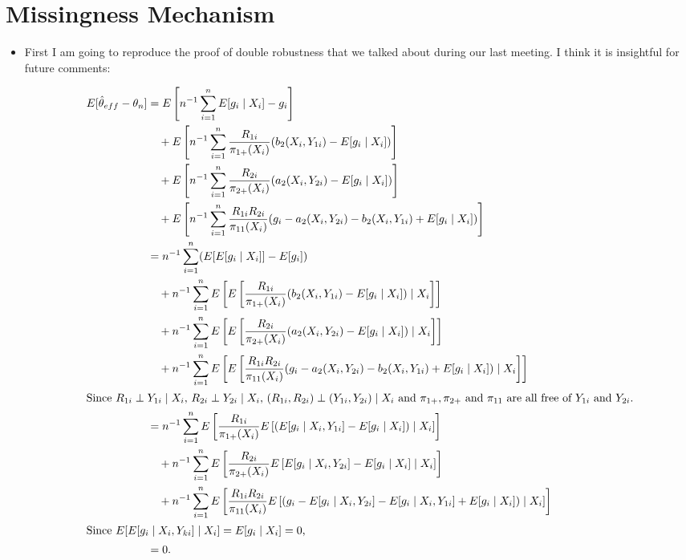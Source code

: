 \documentclass[12pt]{article}
\begin{document}
\newpage

\section*{Missingness Mechanism}

\begin{itemize}
  \item First I am going to reproduce the proof of double robustness that we
    talked about during our last meeting. I think it is insightful for future
    comments:

    \begin{align*}
      E[\hat \theta_{eff} - \theta_n] 
      &= E\left[n^{-1} \sum_{i = 1}^n E[g_i \mid X_i] - g_i\right]\\
      &\quad+ E\left[n^{-1} \sum_{i = 1}^n \frac{R_{1i}}{\pi_{1+}(X_i)}
      (b_2(X_i, Y_{1i}) - E[g_i \mid X_i])\right]\\
      &\quad+ E\left[n^{-1} \sum_{i = 1}^n \frac{R_{2i}}{\pi_{2+}(X_i)}
      (a_2(X_i, Y_{2i}) - E[g_i \mid X_i])\right]\\
      &\quad+ E\left[n^{-1} \sum_{i = 1}^n \frac{R_{1i} R_{2i}}{\pi_{11}(X_i)} 
      (g_i - a_2(X_i, Y_{2i}) - b_2(X_i, Y_{1i}) + E[g_i \mid X_i])\right]\\
      &= n^{-1} \sum_{i = 1}^n (E[E[g_i \mid X_i]] - E[g_i])\\
      &\quad+ n^{-1} \sum_{i = 1}^n E\left[E\left[\frac{R_{1i}}{\pi_{1+}(X_i)} 
      (b_2(X_i, Y_{1i}) - E[g_i \mid X_i]) \mid X_i\right]\right] \\ 
      &\quad+ n^{-1} \sum_{i = 1}^n E\left[E\left[\frac{R_{2i}}{\pi_{2+}(X_i)} 
      (a_2(X_i, Y_{2i}) - E[g_i \mid X_i]) \mid X_i\right]\right] \\
      &\quad+ n^{-1} \sum_{i = 1}^n E\left[E\left[\frac{R_{1i}
      R_{2i}}{\pi_{11}(X_i)} (g_i - a_2(X_i, Y_{2i}) - b_2(X_i, Y_{1i}) + E[g_i
      \mid X_i]) \mid X_i \right]\right]\\
      \intertext{Since $R_{1i} \perp Y_{1i} \mid X_i$, $R_{2i} \perp Y_{2i} \mid
      X_i$, $(R_{1i}, R_{2i}) \perp (Y_{1i}, Y_{2i}) \mid X_i$ and $\pi_{1+},
      \pi_{2+}$ and $\pi_{11}$ are all free of $Y_{1i}$ and $Y_{2i}$.}
      &= n^{-1} \sum_{i = 1}^n E\left[\frac{R_{1i}}{\pi_{1+}(X_i)} E\left[
        (E[g_i \mid X_i, Y_{1i}] - E[g_i \mid X_i]) \mid X_i\right]\right] \\ 
      &\quad+ n^{-1} \sum_{i = 1}^n E\left[\frac{R_{2i}}{\pi_{2+}(X_i)} 
      E\left[E[g_i \mid X_i, Y_{2i}] - E[g_i \mid X_i] \mid X_i\right]\right] \\
      &\quad+ n^{-1} \sum_{i = 1}^n E\left[\frac{R_{1i}
      R_{2i}}{\pi_{11}(X_i)} E\left[(g_i - E[g_i \mid X_i, Y_{2i}] - 
      E[g_i \mid X_i, Y_{1i}]+ E[g_i \mid X_i]) \mid X_i \right]\right]\\
      \intertext{Since $E[E[g_i \mid X_i, Y_{ki}] \mid X_i] = E[g_i \mid X_i] =
      0$,}
      &= 0.
    \end{align*}


\end{itemize}
\end{document}
